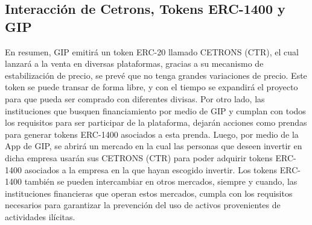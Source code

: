 \subsection{Interacción de Cetrons, Tokens ERC-1400 y GIP}
En resumen, GIP emitirá un token ERC-20 llamado CETRONS (CTR), el cual lanzará a la venta en diversas plataformas, gracias a su mecanismo de estabilización de precio, se prevé que no tenga grandes variaciones de precio. Este token se puede transar de forma libre, y con el tiempo se expandirá el proyecto para que pueda ser comprado con diferentes divisas.
Por otro lado, las instituciones que busquen financiamiento por medio de GIP y cumplan con todos los requisitos para ser participar de la plataforma, dejarán acciones como prendas para generar tokens ERC-1400 asociados a esta prenda. Luego, por medio de la App de GIP, se abrirá un mercado en la cual  las personas que deseen invertir en dicha empresa usarán sus CETRONS (CTR) para poder adquirir tokens ERC-1400 asociados a la empresa en la que hayan escogido invertir. Los tokens ERC-1400 también se pueden intercambiar en otros mercados, siempre y cuando, las instituciones financieras que operan estos mercados, cumpla con los requisitos necesarios para garantizar la prevención del uso de activos provenientes de actividades ilícitas.
